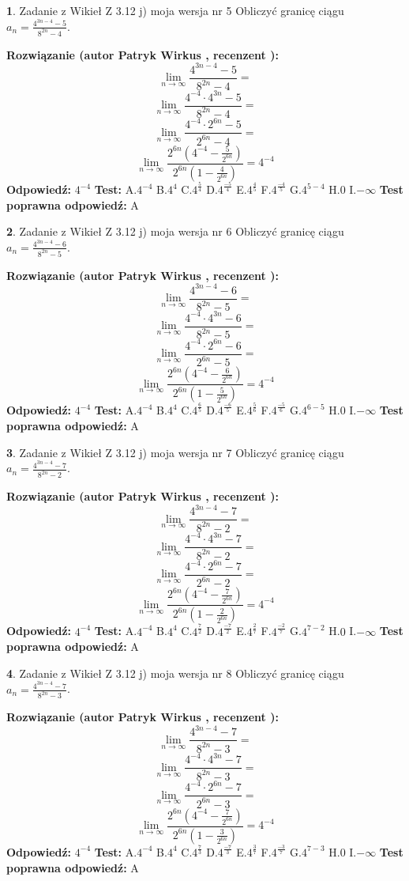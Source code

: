 \documentclass[12pt, a4paper]{article}
\theoremstyle{definition} %
\newtheorem{zad}{}
\newcommand{\zadStart}[1]{\begin{zad}#1\newline}
\newcommand{\zadStop}{\end{zad}}
\newcommand{\rozwStart}[2]{\noindent \textbf{Rozwiązanie (autor #1 , recenzent #2): }\newline}
\newcommand{\rozwStop}{\newline}
\newcommand{\odpStart}{\noindent \textbf{Odpowiedź:}\newline}
\newcommand{\odpStop}{\newline}
\newcommand{\testStart}{\noindent \textbf{Test:}\newline}
\newcommand{\testStop}{\newline}
\newcommand{\kluczStart}{\noindent \textbf{Test poprawna odpowiedź:}\newline}
\newcommand{\kluczStop}{\newline}
\begin{document}
\zadStart{Zadanie z Wikieł Z 3.12 j) moja wersja nr 5}
Obliczyć granicę ciągu $a_{n}=\frac{4^{3n-4}-5}{8^{2n}-4}$.
\zadStop
\rozwStart{Patryk Wirkus}{}
$$\lim\limits_{n\to\infty}\frac{4^{3n-4}-5}{8^{2n}-4}=$$
$$\lim\limits_{n\to\infty}\frac{4^{-4} \cdot 4^{3n}-5}{8^{2n}-4}=$$
$$\lim\limits_{n\to\infty}\frac{4^{-4} \cdot 2^{6n}-5}{2^{6n}-4}=$$
$$\lim\limits_{n\to\infty}\frac{2^{6n}(4^{-4} - \frac{5}{2^{6n}})}{2^{6n}(1-\frac{4}{2^{6n}})}= 4^{-4}$$
\rozwStop
\odpStart
$4^{-4}$
\odpStop
\testStart
A.$4^{-4}$
B.$4^{4}$
C.$4^{\frac{5}{4}}$
D.$4^{\frac{-5}{4}}$
E.$4^{\frac{4}{5}}$
F.$4^{\frac{-4}{5}}$
G.$4^{5-4}$
H.$0$
I.$-\infty$
\testStop
\kluczStart
A
\kluczStop



\zadStart{Zadanie z Wikieł Z 3.12 j) moja wersja nr 6}
Obliczyć granicę ciągu $a_{n}=\frac{4^{3n-4}-6}{8^{2n}-5}$.
\zadStop
\rozwStart{Patryk Wirkus}{}
$$\lim\limits_{n\to\infty}\frac{4^{3n-4}-6}{8^{2n}-5}=$$
$$\lim\limits_{n\to\infty}\frac{4^{-4} \cdot 4^{3n}-6}{8^{2n}-5}=$$
$$\lim\limits_{n\to\infty}\frac{4^{-4} \cdot 2^{6n}-6}{2^{6n}-5}=$$
$$\lim\limits_{n\to\infty}\frac{2^{6n}(4^{-4} - \frac{6}{2^{6n}})}{2^{6n}(1-\frac{5}{2^{6n}})}= 4^{-4}$$
\rozwStop
\odpStart
$4^{-4}$
\odpStop
\testStart
A.$4^{-4}$
B.$4^{4}$
C.$4^{\frac{6}{5}}$
D.$4^{\frac{-6}{5}}$
E.$4^{\frac{5}{6}}$
F.$4^{\frac{-5}{6}}$
G.$4^{6-5}$
H.$0$
I.$-\infty$
\testStop
\kluczStart
A
\kluczStop



\zadStart{Zadanie z Wikieł Z 3.12 j) moja wersja nr 7}
Obliczyć granicę ciągu $a_{n}=\frac{4^{3n-4}-7}{8^{2n}-2}$.
\zadStop
\rozwStart{Patryk Wirkus}{}
$$\lim\limits_{n\to\infty}\frac{4^{3n-4}-7}{8^{2n}-2}=$$
$$\lim\limits_{n\to\infty}\frac{4^{-4} \cdot 4^{3n}-7}{8^{2n}-2}=$$
$$\lim\limits_{n\to\infty}\frac{4^{-4} \cdot 2^{6n}-7}{2^{6n}-2}=$$
$$\lim\limits_{n\to\infty}\frac{2^{6n}(4^{-4} - \frac{7}{2^{6n}})}{2^{6n}(1-\frac{2}{2^{6n}})}= 4^{-4}$$
\rozwStop
\odpStart
$4^{-4}$
\odpStop
\testStart
A.$4^{-4}$
B.$4^{4}$
C.$4^{\frac{7}{2}}$
D.$4^{\frac{-7}{2}}$
E.$4^{\frac{2}{7}}$
F.$4^{\frac{-2}{7}}$
G.$4^{7-2}$
H.$0$
I.$-\infty$
\testStop
\kluczStart
A
\kluczStop



\zadStart{Zadanie z Wikieł Z 3.12 j) moja wersja nr 8}
Obliczyć granicę ciągu $a_{n}=\frac{4^{3n-4}-7}{8^{2n}-3}$.
\zadStop
\rozwStart{Patryk Wirkus}{}
$$\lim\limits_{n\to\infty}\frac{4^{3n-4}-7}{8^{2n}-3}=$$
$$\lim\limits_{n\to\infty}\frac{4^{-4} \cdot 4^{3n}-7}{8^{2n}-3}=$$
$$\lim\limits_{n\to\infty}\frac{4^{-4} \cdot 2^{6n}-7}{2^{6n}-3}=$$
$$\lim\limits_{n\to\infty}\frac{2^{6n}(4^{-4} - \frac{7}{2^{6n}})}{2^{6n}(1-\frac{3}{2^{6n}})}= 4^{-4}$$
\rozwStop
\odpStart
$4^{-4}$
\odpStop
\testStart
A.$4^{-4}$
B.$4^{4}$
C.$4^{\frac{7}{3}}$
D.$4^{\frac{-7}{3}}$
E.$4^{\frac{3}{7}}$
F.$4^{\frac{-3}{7}}$
G.$4^{7-3}$
H.$0$
I.$-\infty$
\testStop
\kluczStart
A
\kluczStop
\end{document}
